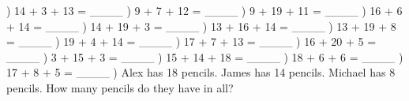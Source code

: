 \documentclass{article}%
\begin{document}
) 14 + 3 + 13 = \_\_\_\_%
\newline%
\newline%
) 9 + 7 + 12 = \_\_\_\_%
\newline%
\newline%
) 9 + 19 + 11 = \_\_\_\_%
\newline%
\newline%
) 16 + 6 + 14 = \_\_\_\_%
\newline%
\newline%
) 14 + 19 + 3 = \_\_\_\_%
\newline%
\newline%
) 13 + 16 + 14 = \_\_\_\_%
\newline%
\newline%
) 13 + 19 + 8 = \_\_\_\_%
\newline%
\newline%
) 19 + 4 + 14 = \_\_\_\_%
\newline%
\newline%
) 17 + 7 + 13 = \_\_\_\_%
\newline%
\newline%
) 16 + 20 + 5 = \_\_\_\_%
\newline%
\newline%
) 3 + 15 + 3 = \_\_\_\_%
\newline%
\newline%
) 15 + 14 + 18 = \_\_\_\_%
\newline%
\newline%
) 18 + 6 + 6 = \_\_\_\_%
\newline%
\newline%
) 17 + 8 + 5 = \_\_\_\_%
\newline%
\newline%
) Alex has 18 pencils. James has 14 pencils. Michael has 8 pencils. How many pencils do they have in all?%
\end{document}
